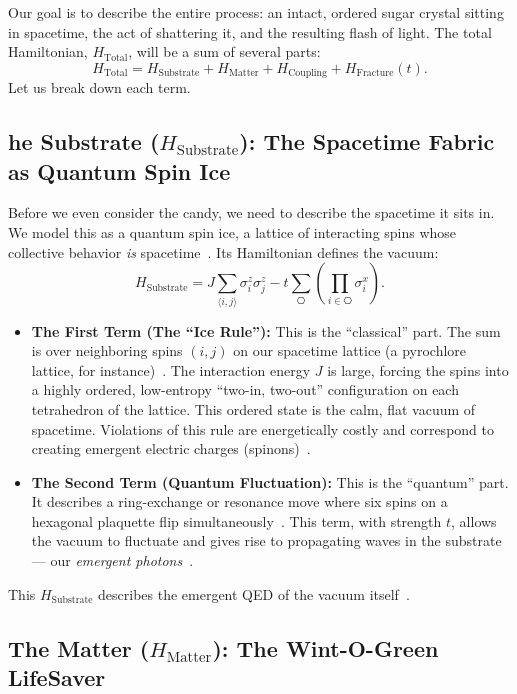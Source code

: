 \documentclass[12pt, a4paper]{article}
\begin{document}
Our goal is to describe the entire process: an intact, ordered sugar crystal sitting in spacetime, the act of shattering it, and the resulting flash of light. The total Hamiltonian, $H_{\mathrm{Total}}$, will be a sum of several parts:
\[
H_{\mathrm{Total}} = H_{\mathrm{Substrate}} + H_{\mathrm{Matter}} + H_{\mathrm{Coupling}} + H_{\mathrm{Fracture}}(t).
\]
Let us break down each term.

\subsection{he Substrate ($H_{\mathrm{Substrate}}$): The Spacetime Fabric as Quantum Spin Ice}

Before we even consider the candy, we need to describe the spacetime it sits in. We model this as a quantum spin ice, a lattice of interacting spins whose collective behavior \emph{is} spacetime~\cite{ref1,ref2}. Its Hamiltonian defines the vacuum:
\[
H_{\mathrm{Substrate}} = J \sum_{\langle i,j \rangle} \sigma_i^z \sigma_j^z - t \sum_{\hexagon} \left(\prod_{i \in \hexagon} \sigma_i^x \right).
\]

\begin{itemize}
    \item \textbf{The First Term (The ``Ice Rule''):} This is the ``classical'' part. The sum is over neighboring spins $(i,j)$ on our spacetime lattice (a pyrochlore lattice, for instance)~\cite{ref1,ref2}. The interaction energy $J$ is large, forcing the spins into a highly ordered, low-entropy ``two-in, two-out'' configuration on each tetrahedron of the lattice. This ordered state is the calm, flat vacuum of spacetime. Violations of this rule are energetically costly and correspond to creating emergent electric charges (spinons)~\cite{ref1}.
    \item \textbf{The Second Term (Quantum Fluctuation):} This is the ``quantum'' part. It describes a ring-exchange or resonance move where six spins on a hexagonal plaquette flip simultaneously~\cite{ref2}. This term, with strength $t$, allows the vacuum to fluctuate and gives rise to propagating waves in the substrate --- our \emph{emergent photons}~\cite{ref3,ref4}.
\end{itemize}

This $H_{\mathrm{Substrate}}$ describes the emergent QED of the vacuum itself~\cite{ref5,ref6}.

\subsection{The Matter ($H_{\mathrm{Matter}}$): The Wint-O-Green LifeSaver}
\end{document}
